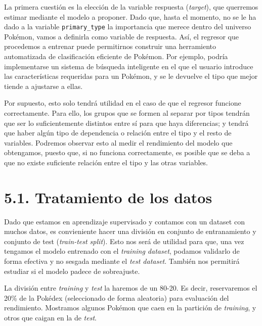 \documentclass[
  12pt,
]{extreport}
\begin{document}
La primera cuestión es la elección de la variable respuesta
(\emph{target}), que querremos estimar mediante el modelo a proponer.
Dado que, hasta el momento, no se le ha dado a la variable
\texttt{primary\_type} la importancia que merece dentro del universo
Pokémon, vamos a definirla como variable de respuesta. Así, el regresor
que procedemos a entrenar puede permitirnos construir una herramiento
automatizada de clasificación eficiente de Pokémon. Por ejemplo, podría
implementarse un sistema de búsqueda inteligente en el que el usuario
introduce las características requeridas para un Pokémon, y se le
devuelve el tipo que mejor tiende a ajustarse a ellas.

Por supuesto, esto solo tendrá utilidad en el caso de que el regresor
funcione correctamente. Para ello, los grupos que se formen al separar
por tipos tendrán que ser lo suficientemente distintos entre sí para que
haya diferencias; y tendrá que haber algún tipo de dependencia o
relación entre el tipo y el resto de variables. Podremos observar esto
al medir el rendimiento del modelo que obtengamos, puesto que, si no
funciona correctamente, es posible que se deba a que no existe
suficiente relación entre el tipo y las otras variables.

\section{5.1. Tratamiento de los datos}\label{tratamiento-de-los-datos}

Dado que estamos en aprendizaje supervisado y contamos con un dataset
con muchos datos, es convieniente hacer una división en conjunto de
entranamiento y conjunto de test (\emph{train-test split}). Esto nos
será de utilidad para que, una vez tengamos el modelo entrenado con el
\emph{training dataset}, podamos validarlo de forma efectiva y no
sesgada mediante el \emph{test dataset}. También nos permitirá estudiar
si el modelo padece de sobreajuste.

La división entre \emph{training} y \emph{test} la haremos de un 80-20.
Es decir, reservaremos el 20\% de la Pokédex (seleccionado de forma
aleatoria) para evaluación del rendimiento. Mostramos algunos Pokémon
que caen en la partición de \emph{training}, y otros que caigan en la de
\emph{test}.
\end{document}
